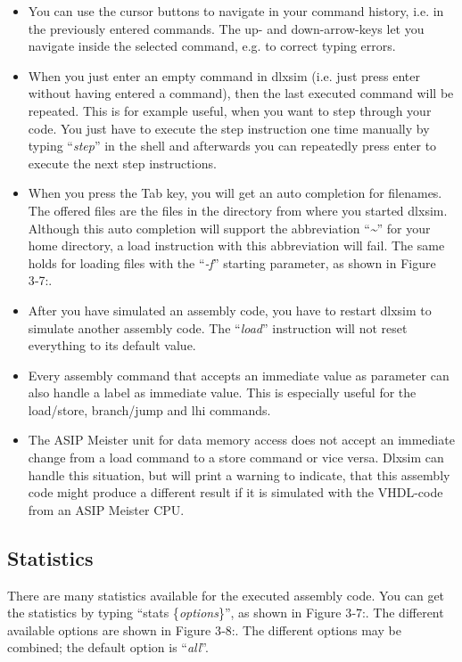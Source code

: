 \begin{itemize}
\item
  You can use the cursor buttons to navigate in your command history,
  i.e. in the previously entered commands. The up- and down-arrow-keys
  let you navigate inside the selected command, e.g. to correct typing
  errors.
\item
  When you just enter an empty command in dlxsim (i.e. just press enter
  without having entered a command), then the last executed command will
  be repeated. This is for example useful, when you want to step through
  your code. You just have to execute the step instruction one time
  manually by typing ``\emph{step}'' in the shell and afterwards you can
  repeatedly press enter to execute the next step instructions.
\item
  When you press the Tab key, you will get an auto completion for
  filenames. The offered files are the files in the directory from where
  you started dlxsim. Although this auto completion will support the
  abbreviation ``\emph{\textasciitilde{}}'' for your home directory, a
  load instruction with this abbreviation will fail. The same holds for
  loading files with the ``\emph{-f}'' starting parameter, as shown in
  Figure 3‑7:.
\item
  After you have simulated an assembly code, you have to restart dlxsim
  to simulate another assembly code. The ``\emph{load}'' instruction
  will not reset everything to its default value.
\item
  Every assembly command that accepts an immediate value as parameter
  can also handle a label as immediate value. This is especially useful
  for the load/store, branch/jump and lhi commands.
\item
  The ASIP Meister unit for data memory access does not accept an
  immediate change from a load command to a store command or vice versa.
  Dlxsim can handle this situation, but will print a warning to
  indicate, that this assembly code might produce a different result if
  it is simulated with the VHDL-code from an ASIP Meister CPU.
\end{itemize}

\hypertarget{statistics}{%
\subsection{Statistics}\label{statistics}}

There are many statistics available for the executed assembly code. You
can get the statistics by typing ``stats \{\emph{options}\}'', as shown
in Figure 3‑7:. The different available options are shown in Figure
3‑8:. The different options may be combined; the default option is
``\emph{all}''.

